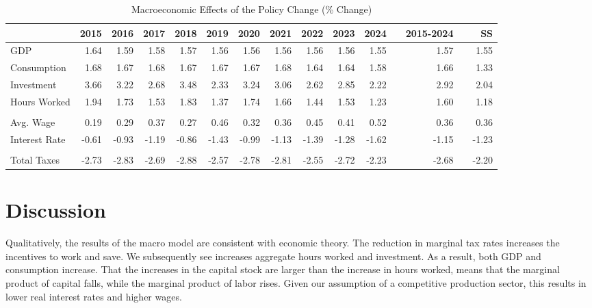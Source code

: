 \documentclass[letterpaper,12pt]{article}
\theoremstyle{definition}
\begin{document}
\begin{spacing}{1.5}
    \begin{table}[htbp]
    \scriptsize
      \centering
      \caption{Macroeconomic Effects of the Policy Change (\% Change)}
        \begin{tabular}{lrrrrrrrrrrrrrr}
        \hline
        \hline
              & 2015  & 2016  & 2017  & 2018  & 2019  & 2020  & 2021  & 2022  & 2023  & 2024  &       & 2015-2024 &       & SS \\
        \hline
        GDP   & 1.64 & 1.59 & 1.58 & 1.57 & 1.56 & 1.56 & 1.56 & 1.56 & 1.56 & 1.55 &       & 1.57 &       & 1.55 \\
        Consumption & 1.68 & 1.67 & 1.68 & 1.67 & 1.67 & 1.67 & 1.68 & 1.64 & 1.64 & 1.58 &       & 1.66 &       & 1.33 \\
        Investment & 3.66 & 3.22 & 2.68 & 3.48 & 2.33 & 3.24 & 3.06 & 2.62 & 2.85 & 2.22 &       & 2.92 &       & 2.04 \\
        Hours Worked & 1.94 & 1.73 & 1.53 & 1.83 & 1.37 & 1.74 & 1.66 & 1.44 & 1.53 & 1.23 &       & 1.60 &       & 1.18 \\
              &       &       &       &       &       &       &       &       &       &       &       &       &       &  \\
        Avg. Wage & 0.19 & 0.29 & 0.37 & 0.27 & 0.46 & 0.32 & 0.36 & 0.45 & 0.41 & 0.52 &       & 0.36 &       & 0.36 \\
        Interest Rate & -0.61 & -0.93 & -1.19 & -0.86 & -1.43 & -0.99 & -1.13 & -1.39 & -1.28 & -1.62 &       & -1.15 &       & -1.23 \\
              &       &       &       &       &       &       &       &       &       &       &       &       &       &  \\
        Total Taxes & -2.73 & -2.83 & -2.69 & -2.88 & -2.57 & -2.78 & -2.81 & -2.55 & -2.72 & -2.23 &       & -2.68 &       & -2.20 \\
        \hline
        \hline
        \end{tabular}%
      \label{tab:macro}%
    \end{table}%


\section{Discussion}\label{SecDiscuss}

  Qualitatively, the results of the macro model are consistent with economic theory. The reduction in marginal tax rates increases the incentives to work and save. We subsequently see increases aggregate hours worked and investment. As a result, both GDP and consumption increase.  That the increases in the capital stock are larger than the increase in hours worked, means that the marginal product of capital falls, while the marginal product of labor rises. Given our assumption of a competitive production sector, this results in lower real interest rates and higher wages.


\end{spacing}
\end{document}
